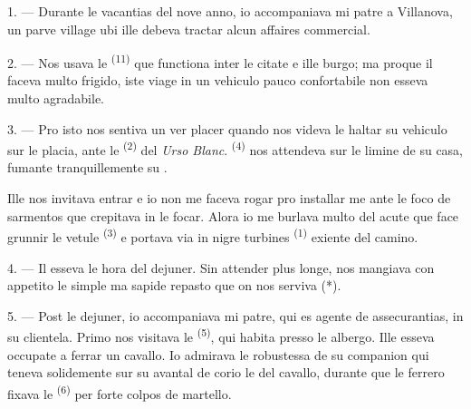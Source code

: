 

\VUsaut{4.0mm}
\VUsaut{3.0mm}
\VUfilet{16mm}
\VUsaut{5.6mm}
\VUsaut{3.0mm}

\VUsaut{3.0mm}

\VUsaut{4.0mm}

1. --- Durante le vacantias del nove anno, io accompaniava mi patre a Villanova,
un parve village ubi ille debeva tractar alcun affaires commercial.

2. --- Nos usava le  \textsuperscript{(11)} que functiona
inter le citate e ille burgo; ma proque il faceva multo frigido, iste viage in
un vehiculo pauco confortabile non esseva multo agradabile.

3. --- Pro isto nos sentiva un ver placer quando nos videva le 
haltar su vehiculo sur le placia, ante le 
\textsuperscript{(2)} del \textit{Urso Blanc}. 
\textsuperscript{(4)} nos attendeva sur le limine de su casa, fumante
tranquillemente su .

Ille nos invitava entrar e io non me faceva rogar pro installar me ante le foco
de sarmentos que crepitava in le focar. Alora io me burlava multo del acute
 que face grunnir le vetule 
\textsuperscript{(3)} e portava via in nigre turbines 
\textsuperscript{(1)} exiente del camino.

4. --- Il esseva le hora del dejuner. Sin attender plus longe, nos mangiava con
appetito le simple ma sapide repasto que on nos serviva (*).

\VUsaut{3.0mm}

5. --- Post le dejuner, io accompaniava mi patre, qui es agente de assecurantias,
in su clientela. Primo nos visitava le  \textsuperscript{(5)},
qui habita presso le albergo. Ille esseva occupate a ferrar un cavallo. Io
admirava le robustessa de su companion qui teneva solidemente sur su avantal de
corio le  del cavallo, durante que le ferrero fixava le
 \textsuperscript{(6)} per forte colpos de martello.

